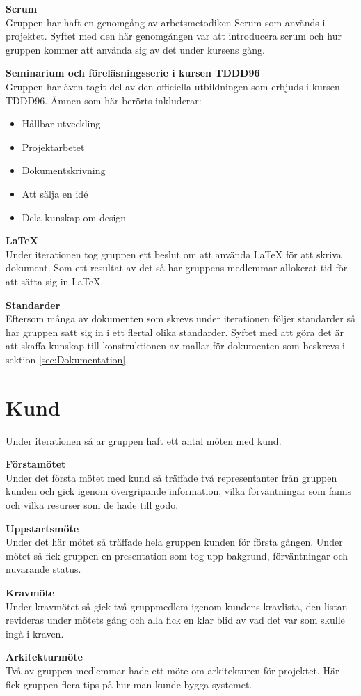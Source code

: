 \documentclass[a4paper,10pt]{article}
\begin{document}
\textbf{Scrum}\\ Gruppen har haft en genomgång av arbetsmetodiken Scrum som används i projektet. Syftet med den här genomgången var att introducera scrum och hur gruppen kommer att använda sig av det under kursens gång.

\textbf{Seminarium och föreläsningsserie i kursen TDDD96}\\ Gruppen har även tagit del av den officiella utbildningen som erbjuds i kursen TDDD96. Ämnen som här berörts inkluderar:
\begin{itemize}
    \item Hållbar utveckling
    \item Projektarbetet
    \item Dokumentskrivning
    \item Att sälja en idé
    \item Dela kunskap om design
\end{itemize}

\textbf{\LaTeX}\\ Under iterationen tog gruppen ett beslut om att använda LaTeX för att skriva dokument. Som ett resultat av det så har gruppens medlemmar allokerat tid för att sätta sig in LaTeX.

\textbf{Standarder}\\ Eftersom många av dokumenten som skrevs under iterationen följer standarder så har gruppen satt sig in i ett flertal olika standarder. Syftet med att göra det är att skaffa kunskap till konstruktionen av mallar för dokumenten som beskrevs i sektion \ref{sec:Dokumentation}.

\section{Kund}
Under iterationen så ar gruppen haft ett antal möten med kund.

\textbf{Förstamötet}\\
Under det första mötet med kund så träffade två representanter från gruppen kunden och gick igenom övergripande information, vilka förväntningar som fanns och vilka resurser som de hade till godo.

\textbf{Uppstartsmöte}\\
Under det här mötet så träffade hela gruppen kunden för första gången. Under mötet så fick gruppen en presentation som tog upp bakgrund, förväntningar och nuvarande status.

\textbf{Kravmöte}\\
Under kravmötet så gick två gruppmedlem igenom kundens kravlista, den listan revideras under mötets gång och alla fick en klar blid av vad det var som skulle ingå i kraven.

\textbf{Arkitekturmöte}\\
Två av gruppen medlemmar hade ett möte om arkitekturen för projektet. Här fick gruppen flera tips på hur man kunde bygga systemet.
\end{document}
